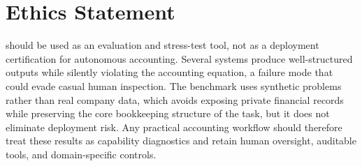 \section*{Ethics Statement}

\benchmark{} should be used as an evaluation and stress-test tool, not
as a deployment certification for autonomous accounting.
Several systems produce well-structured outputs while silently violating
the accounting equation, a failure mode that could evade casual human
inspection.
The benchmark uses synthetic problems rather than real company data,
which avoids exposing private financial records while preserving the
core bookkeeping structure of the task, but it does not eliminate
deployment risk.
Any practical accounting workflow should therefore treat these results
as capability diagnostics and retain human oversight, auditable tools,
and domain-specific controls.
